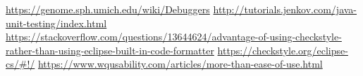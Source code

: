 \documentclass[12pt]{report}
\begin{document}
\begin{thebibliography}{9}
\url{https://genome.sph.umich.edu/wiki/Debuggers}
\url{http://tutorials.jenkov.com/java-unit-testing/index.html}
 \url{https://stackoverflow.com/questions/13644624/advantage-of-using-checkstyle-rather-than-using-eclipse-built-in-code-formatter}
\url{https://checkstyle.org/eclipse-cs/#!/}
\url{https://www.wqusability.com/articles/more-than-ease-of-use.html}
\end{thebibliography}
\end{document}
